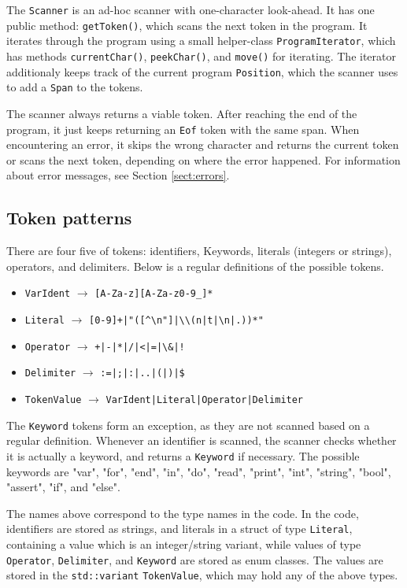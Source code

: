 \documentclass[a4paper]{article}
\newcommand*{\code}[1]{\texttt{#1}}
\begin{document}
The \code{Scanner} is an ad-hoc scanner with one-character look-ahead.
It has one public method: \code{getToken()}, which scans the next token 
in the program.
It iterates through the program using a small helper-class 
\code{ProgramIterator}, which has methods \code{currentChar()}, 
\code{peekChar()}, and \code{move()} for iterating. The 
iterator additionaly keeps track of the current program \code{Position}, 
which the scanner uses to add a \code{Span} to the tokens.

The scanner always returns a viable token. After reaching the 
end of the program, it just keeps returning an \code{Eof} token 
with the same span. When encountering an error, it skips the 
wrong character and returns the current token or scans the next token, 
depending on where the error happened. For information about 
error messages, see Section \ref{sect:errors}.


\subsection{Token patterns}

There are four five of tokens: identifiers, Keywords, 
literals (integers or strings), operators, and delimiters.
Below is a regular definitions of the possible tokens. 
\begin{itemize}
  \item[] \code{VarIdent} $\rightarrow$ \verb?[A-Za-z][A-Za-z0-9_]*?
  \item[] \code{Literal} $\rightarrow$ \verb_[0-9]+|"([^\n"]|\\(n|t|\n|.))*"_
  \item[] \code{Operator} $\rightarrow$ \verb_+|-|*|/|<|=|\&|!_
  \item[] \code{Delimiter} $\rightarrow$ \verb_:=|;|:|..|(|)|$_
  \item[] \code{TokenValue} $\rightarrow$ \verb_VarIdent|Literal|Operator|Delimiter_
\end{itemize}
The \code{Keyword} tokens form an exception, as they are not scanned 
based on a regular definition. Whenever an identifier is scanned, 
the scanner checks whether it is actually a keyword, and returns 
a \code{Keyword} if necessary.
The possible keywords are  "var", "for", "end", "in", "do", "read", "print", 
"int", "string", "bool", "assert", "if", and "else".

The names above correspond to the type names in the code.  
In the code, identifiers are stored as strings, and literals in a 
struct of type \code{Literal}, containing a value which is 
an integer/string variant, while
values of type \code{Operator}, \code{Delimiter}, and \code{Keyword} 
are stored as enum classes.
The values are stored in the \code{std::variant}
\code{TokenValue}, which may hold any of the above types. 
\end{document}

